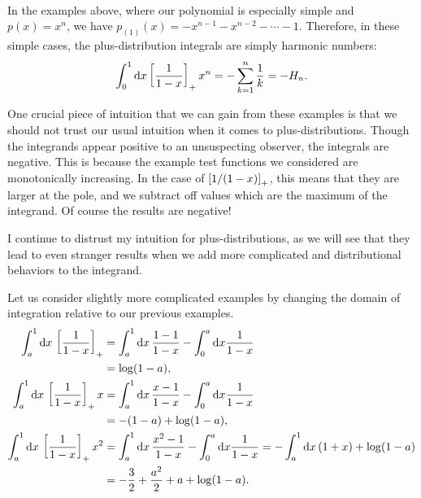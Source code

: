 \begin{subappendices}
~\\
\begin{example}{}
    In the examples above, where our polynomial is especially simple and \(p(x) = x^n\), we have \(p_{(1)}(x) = -x^{n-1} - x^{n-2} - \cdots - 1\).
    Therefore, in these simple cases, the plus-distribution integrals are simply harmonic numbers:
    \begin{align}
        \int_{0}^{1} \dd x \left[\frac{1}{1-x}\right]_+ x^n
        =
        -\sum_{k=1}^n \frac{1}{k}
        =
        -H_n.
    \end{align}
\end{example}

One crucial piece of intuition that we can gain from these examples is that we should not trust our usual intuition when it comes to plus-distributions.
%
Though the integrands appear positive to an unsuspecting observer, the integrals are negative.
%
This is because the example test functions we considered are monotonically increasing.
%
In the case of \(\left[1/(1-x)\right]_+\), this means that they are larger at the pole, and we subtract off values which are the maximum of the integrand.
%
Of course the results are negative!

I continue to distrust my intuition for plus-distributions, as we will see that they lead to even stranger results when we add more complicated and distributional behaviors to the integrand.


Let us consider slightly more complicated examples by changing the domain of integration relative to our previous examples.
\begin{align}
    \int_{a}^{1} \dd x\,\left[\frac{1}{1-x}\right]_+
    &=
    \int_{a}^{1} \dd x\,\frac{1-1}{1-x} - \int_0^a \dd x \frac{1}{1-x}
    \\
    &=
    \log(1-a)
    \notag
    ,
    \\
    \int_{a}^{1} \dd x\,\left[\frac{1}{1-x}\right]_+ x
    &=
    \int_{a}^{1} \dd x\,\frac{x-1}{1-x} - \int_0^a \dd x \frac{1}{1-x}
    \\
    &=
    -(1 - a) + \log(1-a)
    \notag
    ,
    \\
    \int_{a}^{1} \dd x\,\left[\frac{1}{1-x}\right]_+ x^2
    &=
    \int_{a}^{1} \dd x\,\frac{x^2 - 1}{1-x} - \int_0^a \dd x \frac{1}{1-x}
    =
    -\int_a^1 \dd x\, (1+x) + \log(1-a)
    \\
    \notag
    &= -\frac{3}{2} + \frac{a^2}{2} + a + \log(1-a)
    .
\end{align}


\end{subappendices}
